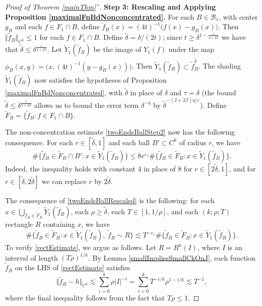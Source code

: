 \documentclass[letterpaper, reqno,11pt]{article}
\numberwithin{equation}{section}
\newcommand{\eps}{\varepsilon}
\numberwithin{thm}{section}
\theoremstyle{remark}
\begin{document}
\begin{proof}[Proof of Theorem \ref{mainThm}\,$'$]
\medskip

\noindent\textbf{Step 3: Rescaling and Applying Proposition \ref{maximalFnBdNonconcentrated}.} 
For each $B\in\mathcal{B}_1$, with center $g_B$ and each $f\in F_1\cap B$, define $\tilde f_B(x) =(4t)^{-1}\big(f(x) - g_B(x)\big)$. Then $\Vert \tilde f_B\Vert_{C^{k}}\leq 1$ for each $f\in F_1\cap B$. Define $\tilde\delta = \delta/(2t)$; since $t\geq\delta^{1-\frac{\eps}{2+2\beta}}$ we have that $\tilde\delta\leq \delta^{\frac{\eps}{2+2\beta}}$. Let $\tilde Y_1(\tilde f_B)$ be the image of $Y_1(f)$ under the map $\phi_B(x,y)= \big(x, (4t)^{-1}(y - g_B(x))\big)$. Then $\tilde Y_1(\tilde f_B)\subset \tilde f_B^{\tilde\delta}$. The shading $\tilde Y_1(\tilde f_B)$ now satisfies the hypotheses of Proposition \ref{maximalFnBdNonconcentrated}, with $\tilde\delta$ in place of $\delta$ and $\tau = \delta$ (the bound $\tilde\delta\leq \delta^{\frac{\eps}{2+2\beta}}$ allows us to bound the error term $\delta^{-\eta}$ by $\tilde\delta^{-(2+2\beta)\eta/\eps}$). Define $\tilde F_B = \{\tilde f_B\colon f\in F_1\cap B\}$. 

The non-concentration estimate \eqref{twoEndsBallStep2} now has the following consequence. For each $r\in[\tilde\delta, 1]$ and each ball $B'\subset C^k$ of radius $r$, we have
    \begin{equation}\label{twoEndsBallRescaled}
        \#\{\tilde f_B\in \tilde F_B \cap B'\colon x\in \tilde Y_1(\tilde f_B) \}\leq 8 r^{\eps_1}\#\{\tilde f_B\in \tilde F_B\colon x\in \tilde Y_1(\tilde f_B)\}.
    \end{equation}
 Indeed, the inequality holds with constant $4$ in place of $8$ for $r\in[2\tilde\delta,1]$, and for $r\in[\tilde\delta,2\tilde\delta]$ we can replace $r$ by $2\tilde\delta.$

The consequence of \eqref{twoEndsBallRescaled} is the following: for each $x\in \bigcup_{\tilde f_B \in \tilde F_B}\tilde Y_1(\tilde f_B)$, each $\rho\geq\tilde\delta$, each $T\in [1,1/\rho]$, and each $(k; \rho; T)$ rectangle $R$ containing $x$, we have
\begin{equation}\label{rectEstimate}
\# \{\tilde f_B \in \tilde F_B \colon x\in \tilde Y_1(\tilde f_B),\ \tilde f_B\sim R\}\lesssim T^{-\eps_1}\# \{\tilde f_B \in \tilde F_B \colon x\in \tilde Y_1(\tilde f_B)\}.
\end{equation}
To verify \eqref{rectEstimate}, we argue as follows. Let $R = R^h(I)$, where $I$ is an interval of length $(T\rho)^{1/k}$. By Lemma \ref{smallImpliesSmallCkOnJ}, each function $\tilde f_B$ on the LHS of \eqref{rectEstimate} satisfies
\[
\Vert \tilde f_B - h\Vert_{C^k} \lesssim \sum_{i=0}^k \rho|I|^{-i} = \sum_{i=0}^k T^{-i/k}\rho^{1-i/k}\lesssim T^{-1},
\]
where the final inequality follows from the fact that $T\rho\leq 1$. 


\end{proof}
\end{document}
